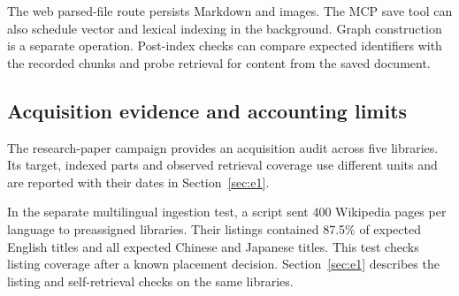 The web parsed-file route persists Markdown and images. The MCP save tool
can also schedule vector and lexical indexing in the background. Graph
construction is a separate operation. Post-index checks can compare
expected identifiers with the recorded chunks and probe retrieval for
content from the saved document.

\subsection{Acquisition evidence and accounting limits}

The research-paper campaign provides an acquisition audit across five
libraries. Its target, indexed parts and observed retrieval coverage use
different units and are reported with their dates in Section~\ref{sec:e1}.

In the separate multilingual ingestion test, a script sent 400 Wikipedia
pages per language to preassigned libraries. Their listings contained
87.5\% of expected English titles and all expected Chinese and Japanese
titles. This test checks listing coverage after a known placement decision.
Section~\ref{sec:e1} describes the listing and self-retrieval checks on the
same libraries.
